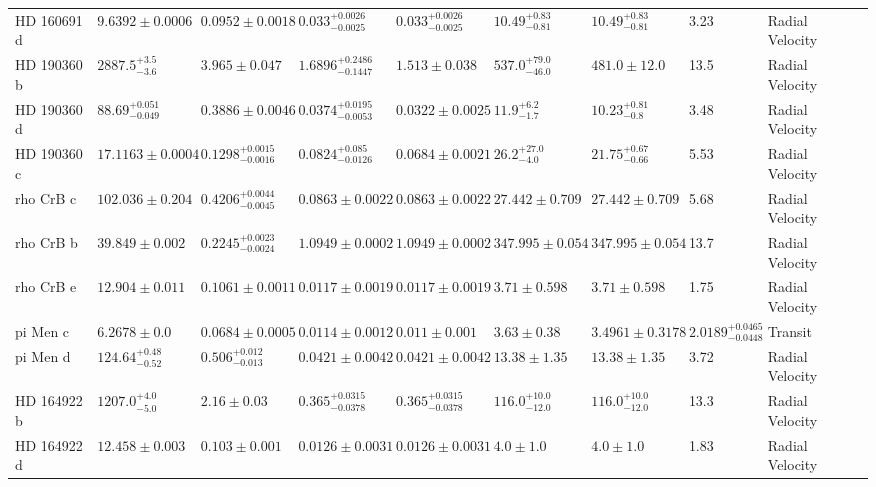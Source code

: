 \begin{tabular}{llllllllll}
HD 160691 d & $9.6392 \pm 0.0006$ & $0.0952 \pm 0.0018$ & $0.033^{+0.0026}_{-0.0025}$ & $0.033^{+0.0026}_{-0.0025}$ & $10.49^{+0.83}_{-0.81}$ & $10.49^{+0.83}_{-0.81}$ & 3.23 & Radial Velocity & \cite{BENEDICT_ET_AL__2022} \\
HD 190360 b & $2887.5^{+3.5}_{-3.6}$ & $3.965 \pm 0.047$ & $1.6896^{+0.2486}_{-0.1447}$ & $1.513 \pm 0.038$ & $537.0^{+79.0}_{-46.0}$ & $481.0 \pm 12.0$ & 13.5 & Radial Velocity & \cite{GIOVINAZZI_ET_AL_2026} \\
HD 190360 d & $88.69^{+0.051}_{-0.049}$ & $0.3886 \pm 0.0046$ & $0.0374^{+0.0195}_{-0.0053}$ & $0.0322 \pm 0.0025$ & $11.9^{+6.2}_{-1.7}$ & $10.23^{+0.81}_{-0.8}$ & 3.48 & Radial Velocity & \cite{GIOVINAZZI_ET_AL_2026} \\
HD 190360 c & $17.1163 \pm 0.0004$ & $0.1298^{+0.0015}_{-0.0016}$ & $0.0824^{+0.085}_{-0.0126}$ & $0.0684 \pm 0.0021$ & $26.2^{+27.0}_{-4.0}$ & $21.75^{+0.67}_{-0.66}$ & 5.53 & Radial Velocity & \cite{GIOVINAZZI_ET_AL_2026} \\
rho CrB c & $102.036 \pm 0.204$ & $0.4206^{+0.0044}_{-0.0045}$ & $0.0863 \pm 0.0022$ & $0.0863 \pm 0.0022$ & $27.442 \pm 0.709$ & $27.442 \pm 0.709$ & 5.68 & Radial Velocity & \cite{ZHAO_ET_AL_2026} \\
rho CrB b & $39.849 \pm 0.002$ & $0.2245^{+0.0023}_{-0.0024}$ & $1.0949 \pm 0.0002$ & $1.0949 \pm 0.0002$ & $347.995 \pm 0.054$ & $347.995 \pm 0.054$ & 13.7 & Radial Velocity & \cite{ZHAO_ET_AL_2026} \\
rho CrB e & $12.904 \pm 0.011$ & $0.1061 \pm 0.0011$ & $0.0117 \pm 0.0019$ & $0.0117 \pm 0.0019$ & $3.71 \pm 0.598$ & $3.71 \pm 0.598$ & 1.75 & Radial Velocity & \cite{ZHAO_ET_AL_2026} \\
pi Men c & $6.2678 \pm 0.0$ & $0.0684 \pm 0.0005$ & $0.0114 \pm 0.0012$ & $0.011 \pm 0.001$ & $3.63 \pm 0.38$ & $3.4961 \pm 0.3178$ & $2.0189^{+0.0465}_{-0.0448}$ & Transit & \cite{KUNOVAC_HODZIC_ET_AL_2021} \\
pi Men d & $124.64^{+0.48}_{-0.52}$ & $0.506^{+0.012}_{-0.013}$ & $0.0421 \pm 0.0042$ & $0.0421 \pm 0.0042$ & $13.38 \pm 1.35$ & $13.38 \pm 1.35$ & 3.72 & Radial Velocity & \cite{HATZES_ET_AL__2022} \\
HD 164922 b & $1207.0^{+4.0}_{-5.0}$ & $2.16 \pm 0.03$ & $0.365^{+0.0315}_{-0.0378}$ & $0.365^{+0.0315}_{-0.0378}$ & $116.0^{+10.0}_{-12.0}$ & $116.0^{+10.0}_{-12.0}$ & 13.3 & Radial Velocity & \cite{BENATTI_ET_AL__2020} \\
HD 164922 d & $12.458 \pm 0.003$ & $0.103 \pm 0.001$ & $0.0126 \pm 0.0031$ & $0.0126 \pm 0.0031$ & $4.0 \pm 1.0$ & $4.0 \pm 1.0$ & 1.83 & Radial Velocity & \cite{BENATTI_ET_AL__2020} \\

\end{tabular}
